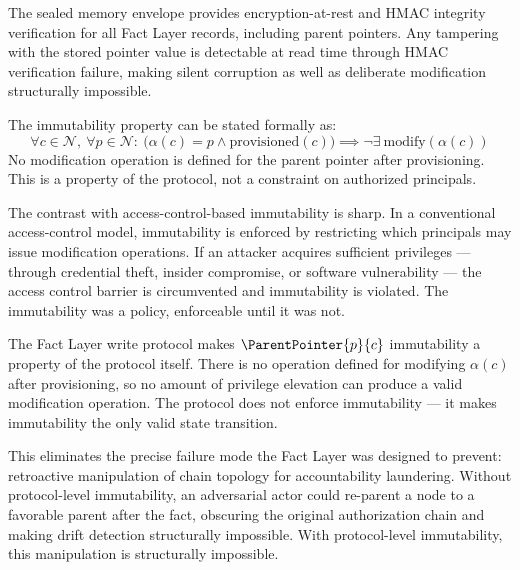 The sealed memory envelope provides encryption-at-rest and HMAC integrity verification for all Fact Layer records, including parent pointers. Any tampering with the stored pointer value is detectable at read time through HMAC verification failure, making silent corruption as well as deliberate modification structurally impossible.

The immutability property can be stated formally as:
\begin{equation}
\forall c \in \mathcal{N},\ \forall p \in \mathcal{N}:\ \bigl(\alpha(c) = p \land \mathrm{provisioned}(c)\bigr) \implies \neg\exists\ \mathrm{modify}(\alpha(c))
\label{eq:alpha-immutable}
\end{equation}
No modification operation is defined for the parent pointer after provisioning. This is a property of the protocol, not a constraint on authorized principals.

The contrast with access-control-based immutability is sharp. In a conventional access-control model, immutability is enforced by restricting which principals may issue modification operations. If an attacker acquires sufficient privileges --- through credential theft, insider compromise, or software vulnerability --- the access control barrier is circumvented and immutability is violated. The immutability was a policy, enforceable until it was not.

The Fact Layer write protocol makes $\ParentPointer{p}{c}$ immutability a property of the protocol itself. There is no operation defined for modifying $\alpha(c)$ after provisioning, so no amount of privilege elevation can produce a valid modification operation. The protocol does not enforce immutability --- it makes immutability the only valid state transition.

This eliminates the precise failure mode the Fact Layer was designed to prevent: retroactive manipulation of chain topology for accountability laundering. Without protocol-level immutability, an adversarial actor could re-parent a node to a favorable parent after the fact, obscuring the original authorization chain and making drift detection structurally impossible. With protocol-level immutability, this manipulation is structurally impossible.

